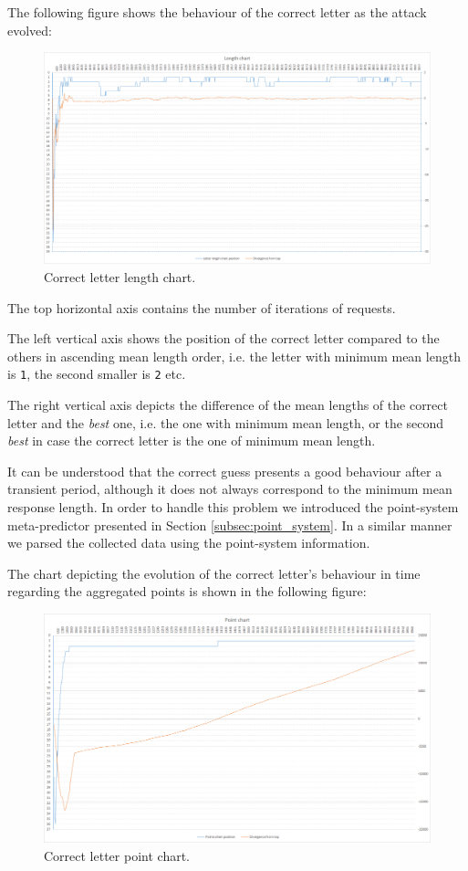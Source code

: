 The following figure shows the behaviour of the correct letter as the attack
evolved:

\begin{figure}[H] \caption{Correct letter length chart.}
\includegraphics[width=1\textwidth]{diagrams/point_system_chart_1.png}\end{figure}

The top horizontal axis contains the number of iterations of requests.

The left vertical axis shows the position of the correct letter compared to the
others in ascending mean length order, i.e. the letter with minimum mean length
is \texttt{1}, the second smaller is \texttt{2} etc.

The right vertical axis depicts the difference of the mean lengths of the
correct letter and the \textit{best} one, i.e. the one with minimum mean length,
or the second \textit{best} in case the correct letter is the one of minimum
mean length.

It can be understood that the correct guess presents a good behaviour after a
transient period, although it does not always correspond to the minimum mean
response length. In order to handle this problem we introduced the point-system meta-predictor
presented in Section \ref{subsec:point_system}. In a similar manner we parsed
the collected data using the point-system information.

The chart depicting the evolution of the correct letter's
behaviour in time regarding the aggregated points is shown in the following
figure:

\begin{figure}[H] \caption{Correct letter point chart.}
\includegraphics[width=1\textwidth]{diagrams/point_system_chart_2.png}\end{figure}

